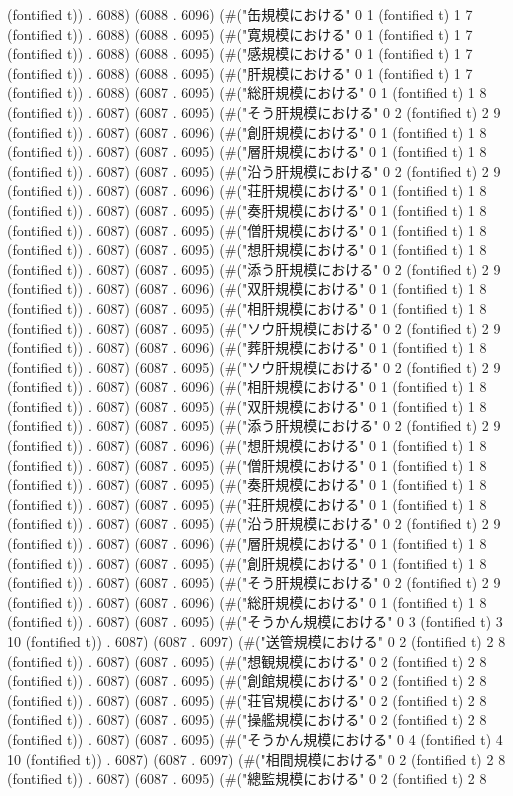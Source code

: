 (fontified t)) . 6088) (6088 . 6096) (#("缶規模における" 0 1 (fontified t) 1 7 (fontified t)) . 6088) (6088 . 6095) (#("寛規模における" 0 1 (fontified t) 1 7 (fontified t)) . 6088) (6088 . 6095) (#("感規模における" 0 1 (fontified t) 1 7 (fontified t)) . 6088) (6088 . 6095) (#("肝規模における" 0 1 (fontified t) 1 7 (fontified t)) . 6088) (6087 . 6095) (#("総肝規模における" 0 1 (fontified t) 1 8 (fontified t)) . 6087) (6087 . 6095) (#("そう肝規模における" 0 2 (fontified t) 2 9 (fontified t)) . 6087) (6087 . 6096) (#("創肝規模における" 0 1 (fontified t) 1 8 (fontified t)) . 6087) (6087 . 6095) (#("層肝規模における" 0 1 (fontified t) 1 8 (fontified t)) . 6087) (6087 . 6095) (#("沿う肝規模における" 0 2 (fontified t) 2 9 (fontified t)) . 6087) (6087 . 6096) (#("荘肝規模における" 0 1 (fontified t) 1 8 (fontified t)) . 6087) (6087 . 6095) (#("奏肝規模における" 0 1 (fontified t) 1 8 (fontified t)) . 6087) (6087 . 6095) (#("僧肝規模における" 0 1 (fontified t) 1 8 (fontified t)) . 6087) (6087 . 6095) (#("想肝規模における" 0 1 (fontified t) 1 8 (fontified t)) . 6087) (6087 . 6095) (#("添う肝規模における" 0 2 (fontified t) 2 9 (fontified t)) . 6087) (6087 . 6096) (#("双肝規模における" 0 1 (fontified t) 1 8 (fontified t)) . 6087) (6087 . 6095) (#("相肝規模における" 0 1 (fontified t) 1 8 (fontified t)) . 6087) (6087 . 6095) (#("ソウ肝規模における" 0 2 (fontified t) 2 9 (fontified t)) . 6087) (6087 . 6096) (#("葬肝規模における" 0 1 (fontified t) 1 8 (fontified t)) . 6087) (6087 . 6095) (#("ソウ肝規模における" 0 2 (fontified t) 2 9 (fontified t)) . 6087) (6087 . 6096) (#("相肝規模における" 0 1 (fontified t) 1 8 (fontified t)) . 6087) (6087 . 6095) (#("双肝規模における" 0 1 (fontified t) 1 8 (fontified t)) . 6087) (6087 . 6095) (#("添う肝規模における" 0 2 (fontified t) 2 9 (fontified t)) . 6087) (6087 . 6096) (#("想肝規模における" 0 1 (fontified t) 1 8 (fontified t)) . 6087) (6087 . 6095) (#("僧肝規模における" 0 1 (fontified t) 1 8 (fontified t)) . 6087) (6087 . 6095) (#("奏肝規模における" 0 1 (fontified t) 1 8 (fontified t)) . 6087) (6087 . 6095) (#("荘肝規模における" 0 1 (fontified t) 1 8 (fontified t)) . 6087) (6087 . 6095) (#("沿う肝規模における" 0 2 (fontified t) 2 9 (fontified t)) . 6087) (6087 . 6096) (#("層肝規模における" 0 1 (fontified t) 1 8 (fontified t)) . 6087) (6087 . 6095) (#("創肝規模における" 0 1 (fontified t) 1 8 (fontified t)) . 6087) (6087 . 6095) (#("そう肝規模における" 0 2 (fontified t) 2 9 (fontified t)) . 6087) (6087 . 6096) (#("総肝規模における" 0 1 (fontified t) 1 8 (fontified t)) . 6087) (6087 . 6095) (#("そうかん規模における" 0 3 (fontified t) 3 10 (fontified t)) . 6087) (6087 . 6097) (#("送管規模における" 0 2 (fontified t) 2 8 (fontified t)) . 6087) (6087 . 6095) (#("想観規模における" 0 2 (fontified t) 2 8 (fontified t)) . 6087) (6087 . 6095) (#("創館規模における" 0 2 (fontified t) 2 8 (fontified t)) . 6087) (6087 . 6095) (#("荘官規模における" 0 2 (fontified t) 2 8 (fontified t)) . 6087) (6087 . 6095) (#("操艦規模における" 0 2 (fontified t) 2 8 (fontified t)) . 6087) (6087 . 6095) (#("そうかん規模における" 0 4 (fontified t) 4 10 (fontified t)) . 6087) (6087 . 6097) (#("相間規模における" 0 2 (fontified t) 2 8 (fontified t)) . 6087) (6087 . 6095) (#("總監規模における" 0 2 (fontified t) 2 8 
